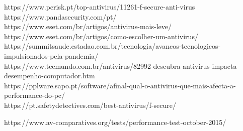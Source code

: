 \documentclass[10pt,conference,twocolumn]{article}
\begin{document}
https://www.pcrisk.pt/top-antivirus/11261-f-secure-anti-virus\\

https://www.pandasecurity.com/pt/\\

https://www.eset.com/br/artigos/antivirus-mais-leve/\\

https://www.eset.com/br/artigos/como-escolher-um-antivirus/\\

https://summitsaude.estadao.com.br/tecnologia/avancos-tecnologicos-impulsionados-pela-pandemia/\\

https://www.tecmundo.com.br/antivirus/82992-descubra-antivirus-impacta-desempenho-computador.htm\\

https://pplware.sapo.pt/software/afinal-qual-o-antivirus-que-mais-afecta-a-performance-do-pc/\\

https://pt.safetydetectives.com/best-antivirus/f-secure/

https://www.av-comparatives.org/tests/performance-test-october-2015/
\end{document}

